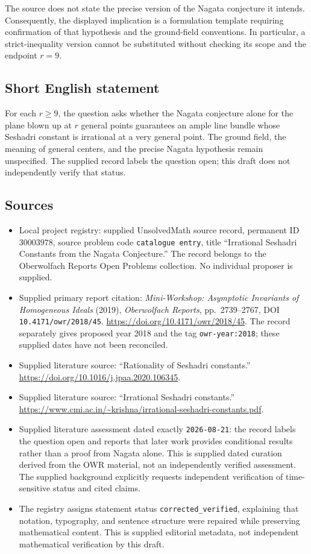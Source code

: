 \documentclass[11pt]{article}
\begin{document}
The source does not state the precise version of the Nagata conjecture it intends. Consequently, the displayed implication is a formulation template requiring confirmation of that hypothesis and the ground-field conventions. In particular, a strict-inequality version cannot be substituted without checking its scope and the endpoint \(r=9\).
\subsection{Short English statement}
For each \(r\geq 9\), the question asks whether the Nagata conjecture alone for the plane blown up at \(r\) general points guarantees an ample line bundle whose Seshadri constant is irrational at a very general point. The ground field, the meaning of general centers, and the precise Nagata hypothesis remain unspecified. The supplied record labels the question open; this draft does not independently verify that status.
\subsection{Sources}
\begin{itemize}
\item Local project registry: supplied UnsolvedMath source record, permanent ID \(30003978\), source problem code \texttt{catalogue entry}, title ``Irrational Seshadri Constants from the Nagata Conjecture.'' The record belongs to the Oberwolfach Reports Open Problems collection. No individual proposer is supplied.
\item Supplied primary report citation: \emph{Mini-Workshop: Asymptotic Invariants of Homogeneous Ideals} (2019), \emph{Oberwolfach Reports}, pp.\ 2739--2767, DOI \texttt{10.4171/owr/2018/45}. \url{https://doi.org/10.4171/owr/2018/45}. The record separately gives proposed year 2018 and the tag \texttt{owr-year:2018}; these supplied dates have not been reconciled.
\item Supplied literature source: ``Rationality of Seshadri constants.'' \url{https://doi.org/10.1016/j.jpaa.2020.106345}.
\item Supplied literature source: ``Irrational Seshadri constants.'' \url{https://www.cmi.ac.in/~krishna/irrational-seshadri-constants.pdf}.
\item Supplied literature assessment dated exactly \texttt{2026-08-21}: the record labels the question open and reports that later work provides conditional results rather than a proof from Nagata alone. This is supplied dated curation derived from the OWR material, not an independently verified assessment. The supplied background explicitly requests independent verification of time-sensitive status and cited claims.
\item The registry assigns statement status \texttt{corrected\_verified}, explaining that notation, typography, and sentence structure were repaired while preserving mathematical content. This is supplied editorial metadata, not independent mathematical verification by this draft.
\end{itemize}
\end{document}
